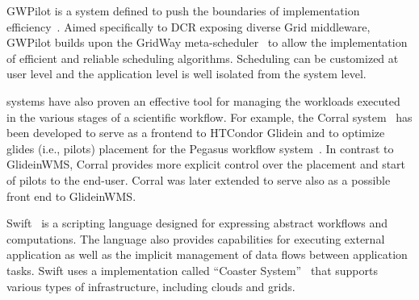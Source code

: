 \documentclass{sig-alternate}
\begin{document}



GWPilot is a \pilot system defined to push the boundaries of implementation
efficiency~\cite{rubio2015gwpilot}. Aimed specifically to DCR exposing diverse
Grid middleware, GWPilot builds upon the GridWay
meta-scheduler~\cite{huedo2007modular} to allow the implementation of efficient
and reliable scheduling algorithms. Scheduling can be customized at user level
and the application level is well isolated from the \pilot system level.

\pilotjob systems have also proven an effective tool for managing the workloads
executed in the various stages of a scientific workflow. For example, the Corral
system~\cite{rynge2011experiences} has been developed to serve as a frontend to
HTCondor Glidein and to optimize glides (i.e., pilots) placement for the Pegasus
workflow system~\cite{deelman2015}. In contrast to GlideinWMS, Corral provides
more explicit control over the placement and start of pilots to the end-user.
Corral was later extended to serve also as a possible front end to GlideinWMS.

Swift~\cite{wilde2011swift} is a scripting language designed for expressing
abstract workflows and computations. The language also provides capabilities for
executing external application as well as the implicit management of data flows
between application tasks. Swift uses a \pilot implementation called ``Coaster
System''~\cite{coasters_url} that supports various types of infrastructure,
including clouds and grids.
\end{document}
